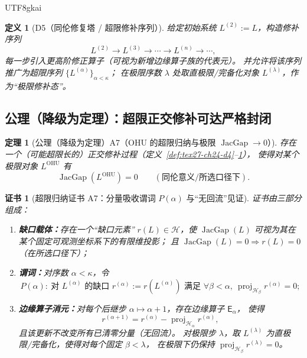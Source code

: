 \documentclass[12pt]{article}
\newtheorem{definition}{定义}[section]
\newtheorem{theorem}{定理}[section]
\newtheorem{Certificate}{证书}[section]
\newcommand{\JacGap}{\operatorname{JacGap}}
\begin{document}
\begin{CJK*}{UTF8}{gkai}
\begin{definition}[D5（同伦修复塔 / 超限修补序列）]
\label{def:tex27-ch24-d5}
给定初始系统 $L^{(2)}:=L$，构造修补序列
\[
  L^{(2)}\to L^{(3)}\to\cdots\to L^{(n)}\to\cdots,
\]
每一步引入更高阶修正算子（可视为新增边缘算子族的代表元）。
并允许将该序列推广为超限序列 $\{L^{(\alpha)}\}_{\alpha<\kappa}$；
在极限序数 $\lambda$ 处取直极限/完备化对象 $L^{(\lambda)}$，作为“极限修补态”。
\end{definition}

\subsection{公理（降级为定理）：超限正交修补可达严格封闭}
\label{subsec:tex27-ch24-axiom}

\begin{theorem}[公理（降级为定理）A7（OHU 的超限归纳与极限 $\JacGap\to 0$）]
\label{thm:tex27-ch24-a7}
存在一个（可能超限长的）正交修补过程（定义~\ref{def:tex27-ch24-d4}--\ref{def:tex27-ch24-d5}），
使得对某个极限对象 $L^{\mathrm{OHU}}$ 有
\[
  \JacGap(L^{\mathrm{OHU}})=0
  \qquad
  (\text{同伦意义/所选口径下}).
\]
\end{theorem}

\begin{Certificate}[超限归纳证书 A7：分量吸收谓词 $P(\alpha)$ 与“无回流”见证]
\label{cert:tex27-ch24-a7}
证书由三部分组成：
\begin{enumerate}
  \item \textbf{缺口载体：}存在一个“缺口元素” $r(L)\in\mathcal{H}$，使 $\JacGap(L)$ 可视为其在某个固定可观测坐标系下的有限维投影；
  且 $\JacGap(L)=0 \Rightarrow r(L)=0$（在所选口径下）；
  \item \textbf{谓词：}对序数 $\alpha<\kappa$，令
  \[
    P(\alpha):\ \text{对 }L^{(\alpha)}\text{ 的缺口 }r^{(\alpha)}:=r(L^{(\alpha)})\text{ 满足 }\forall \beta<\alpha,\
    \operatorname{proj}_{\mathcal{H}_\beta} r^{(\alpha)}=0;
  \]
  \item \textbf{边缘算子消元：}对每个后继步 $\alpha\mapsto\alpha+1$，存在边缘算子 $\mathsf{E}_\alpha$，
  使得
  \[
    r^{(\alpha+1)}
    =
    r^{(\alpha)}-\operatorname{proj}_{\mathcal{H}_\alpha} r^{(\alpha)},
  \]
  且该更新不改变所有已清零分量（无回流）。
  对极限步 $\lambda$，取 $L^{(\lambda)}$ 为直极限/完备化，使得对每个固定 $\beta<\lambda$，
  在极限下仍保持 $\operatorname{proj}_{\mathcal{H}_\beta} r^{(\lambda)}=0$。
\end{enumerate}
\end{Certificate}


\end{CJK*}
\end{document}
